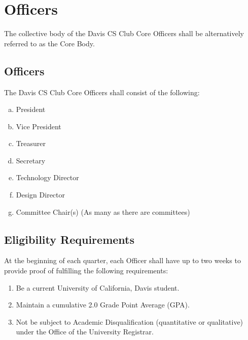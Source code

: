 \documentclass{article}
\newenvironment{li}{
\begin{enumerate}
  \setlength{\itemsep}{1pt}
  \setlength{\parskip}{0pt}
  \setlength{\parsep}{0pt}
}{\end{enumerate}}
\begin{document}
\section{Officers}
The collective body of the Davis CS Club Core Officers shall be alternatively referred to as the Core Body.

\subsection{Officers}
The Davis CS Club Core Officers shall consist of the following:
\begin{enumerate}[a.]
  \setlength{\itemsep}{1pt}
  \setlength{\parskip}{0pt}
  \setlength{\parsep}{0pt}
\item President
\item Vice President
\item Treasurer
\item Secretary
\item Technology Director
\item Design Director
\item Committee Chair(s) (As many as there are committees)
\end{enumerate}

\subsection{Eligibility Requirements}
At the beginning of each quarter, each Officer shall have up to two weeks to provide proof of fulfilling the following requirements:
\begin{li}
\item Be a current University of California, Davis student.
\item Maintain a cumulative 2.0 Grade Point Average (GPA).
\item Not be subject to Academic Disqualification (quantitative or qualitative) under the Office of the University Registrar.
\end{li}
\end{document}
